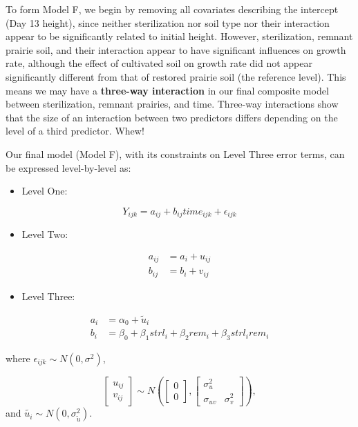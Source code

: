 \documentclass[
]{krantz}
\providecommand{\tightlist}{%
  \setlength{\itemsep}{0pt}\setlength{\parskip}{0pt}}
\begin{document}
To form Model F, we begin by removing all covariates describing the intercept (Day 13 height), since neither sterilization nor soil type nor their interaction appear to be significantly related to initial height. However, sterilization, remnant prairie soil, and their interaction appear to have significant influences on growth rate, although the effect of cultivated soil on growth rate did not appear significantly different from that of restored prairie soil (the reference level). This means we may have a \textbf{three-way interaction} in our final composite model between sterilization, remnant prairies, and time. Three-way interactions show that the size of an interaction between two predictors differs depending on the level of a third predictor. Whew!

Our final model (Model F), with its constraints on Level Three error terms, can be expressed level-by-level as:

\begin{itemize}
\tightlist
\item
  Level One:
\end{itemize}

\begin{equation}
Y_{ijk} = a_{ij}+b_{ij}\textstyle{time}_{ijk}+\epsilon_{ijk}
\end{equation}

\begin{itemize}
\tightlist
\item
  Level Two:
\end{itemize}

\begin{align*}
a_{ij} & = a_{i}+u_{ij} \\
b_{ij} & = b_{i}+v_{ij}
\end{align*}

\begin{itemize}
\tightlist
\item
  Level Three:
\end{itemize}

\begin{align*}
a_{i} & = \alpha_{0} + \tilde{u}_{i} \\
b_{i} & = \beta_{0}+\beta_{1}\textstyle{strl}_{i}+\beta_{2}\textstyle{rem}_{i} + \beta_{3}\textstyle{strl}_{i}\textstyle{rem}_{i}
\end{align*}

where \(\epsilon_{ijk}\sim N(0,\sigma^2)\),

\[ \left[ \begin{array}{c}
            u_{ij} \\ v_{ij}
          \end{array}  \right] \sim N \left( \left[
          \begin{array}{c}
            0 \\ 0
          \end{array} \right], \left[
          \begin{array}{cc}
            \sigma_{u}^{2} & \\
            \sigma_{uv} & \sigma_{v}^{2}
          \end{array} \right] \right), \]
and \(\tilde{{u}_{i}}\sim N(0,\sigma_{\tilde{u}}^{2})\).
\end{document}
